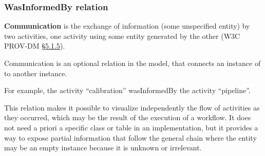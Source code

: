 \subsubsection{WasInformedBy relation}

\textbf{Communication} is the exchange of information (some unspecified entity) by two activities, one activity using some entity generated by the other (W3C PROV-DM \href{https://www.w3.org/TR/prov-dm/#term-Communication}{\S5.1.5}).

Communication is an optional relation  in the model, that connects an instance of  to another instance.

For example, the activity ``calibration'' wasInformedBy the activity ``pipeline''.

This relation makes it possible to visualize independently the flow of activities as they occurred, which may be the result of the execution of a workflow. It does not need a priori a specific class or table in an implementation, but it provides a way to expose partial information that follow the general chain  where the entity may be an empty instance because it is unknown or irrelevant.






